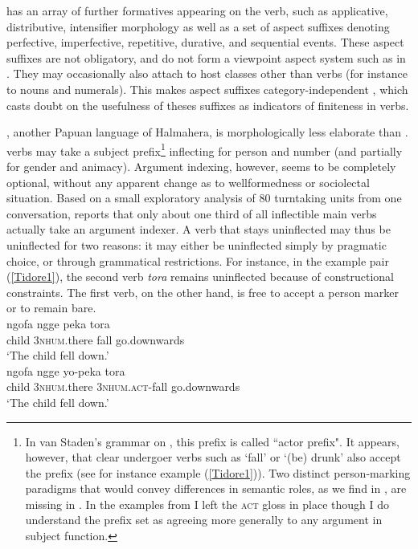  has an array of further formatives appearing on the verb, such as applicative, distributive, intensifier morphology as well as a set of aspect suffixes denoting perfective, imperfective, repetitive, durative, and sequential events. These aspect suffixes are not obligatory, and do not form a viewpoint aspect system such as in . They may occasionally also attach to host classes other than verbs (for instance to nouns and numerals). This makes  aspect suffixes category-independent \citep[44]{holton2003tobelo}, which casts doubt on the usefulness of theses suffixes as indicators of finiteness in verbs. 

, another Papuan language of Halmahera, is morphologically less elaborate than .  verbs may take a subject prefix\footnote{In van Staden's grammar on , this prefix is called ``actor prefix". It appears, however, that clear undergoer verbs such as `fall' or `(be) drunk' also accept the prefix (see for instance example (\ref{Tidore1})). Two distinct person-marking paradigms that would convey differences in semantic roles, as we find in , are missing in . In the examples from  I left the \textsc{act} gloss in place though I do understand the prefix set as agreeing more generally to any argument in subject function.} inflecting for person and number (and partially for gender and animacy). Argument indexing, however, seems to be completely optional, without any apparent change as to wellformedness or sociolectal situation. Based on a small exploratory analysis of 80 turntaking units from one conversation, \citet[79]{vanstaden2000tidore} reports that only about one third of all inflectible main verbs actually take an argument indexer. A verb that stays uninflected may thus be uninflected for two reasons: it may either be uninflected simply by pragmatic choice, or through grammatical restrictions. For instance, in the example pair (\ref{Tidore1}), the second verb \textit{tora} remains uninflected because of constructional constraints. The first verb, on the other hand, is free to accept a person marker or to remain bare.
\ea \label{Tidore1}
\\
\ea
\gll ngofa ngge peka tora \\
child 3\textsc{nhum}.there fall go.downwards \\
\glft `The child fell down.’ \\ 
\ex
\gll ngofa ngge yo-peka tora \\ 
child 3\textsc{nhum}.there 3\textsc{nhum}.\textsc{act}-fall go.downwards \\
\glft `The child fell down.’ \\    
\z
\z

